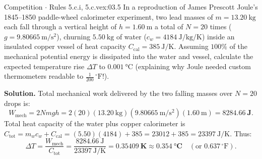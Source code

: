\begin{workedexample}{Competition $\cdot$ Rules 5.c.i, 5.c.v}{ex:03.5}
In a reproduction of James Prescott Joule's 1845--1850 paddle-wheel calorimeter experiment, two lead masses of $m = \SI{13.20}{\kilogram}$ each fall through a vertical height of $h = \SI{1.60}{\meter}$ a total of $N = 20$ times ($g = \SI{9.80665}{\meter\per\square\second}$), churning $\SI{5.50}{\kilogram}$ of water ($c_w = \SI{4184}{\joule\per\kilogram\per\kelvin}$) inside an insulated copper vessel of heat capacity $C_{\mathrm{cal}} = \SI{385}{\joule\per\kelvin}$. Assuming $100\%$ of the mechanical potential energy is dissipated into the water and vessel, calculate the expected temperature rise $\Delta T$ to $\SI{0.001}{\celsius}$ (explaining why Joule needed custom thermometers readable to $\frac{1}{200}\,^\circ\mathrm{F}$!).

\textbf{Solution.}
Total mechanical work delivered by the two falling masses over $N = 20$ drops is:
\[
  W_{\mathrm{mech}} = 2 N m g h = 2(20)(\SI{13.20}{\kilogram})(\SI{9.80665}{\meter\per\square\second})(\SI{1.60}{\meter}) = \mathbf{\SI{8284.66}{\joule}}.
\]
Total heat capacity of the water plus copper calorimeter is $C_{\mathrm{tot}} = m_w c_w + C_{\mathrm{cal}} = (5.50)(4184) + 385 = 23012 + 385 = \SI{23397}{\joule\per\kelvin}$. Thus:
\[
  \Delta T = \frac{W_{\mathrm{mech}}}{C_{\mathrm{tot}}} = \frac{\SI{8284.66}{\joule}}{\SI{23397}{\joule\per\kelvin}} = \mathbf{\SI{0.35409}{\kelvin} \approx \SI{0.354}{\celsius}} \quad (\text{or } 0.637\,^\circ\mathrm{F}).
\]
\end{workedexample}

